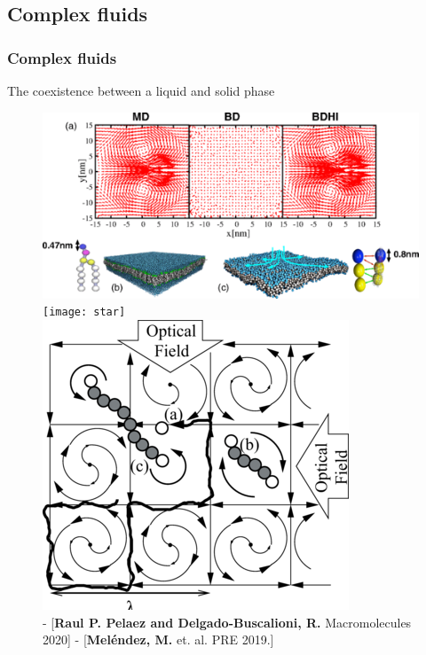 \documentclass[xcolor=dvipsnames, compress]{beamer}
\begin{document}
\subsection{Complex fluids}
\begin{frame}
  \frametitle{Complex fluids}
\centering \Large  The coexistence between a liquid and solid phase
  \begin{figure}
    \centering
    \includegraphics[width=0.5\linewidth]{membrane}\texttt{[image: star]}
    \includegraphics[width=0.2\linewidth]{optofluidics}\\
    {\fontsize{4.5}{12}   -  [{\bf Raul P. Pelaez and Delgado-Buscalioni, R.} Macromolecules 2020]    -   [{\bf  Mel\'endez, M.} et. al. PRE 2019.]}\\

\end{figure}
\end{frame}
\end{document}
